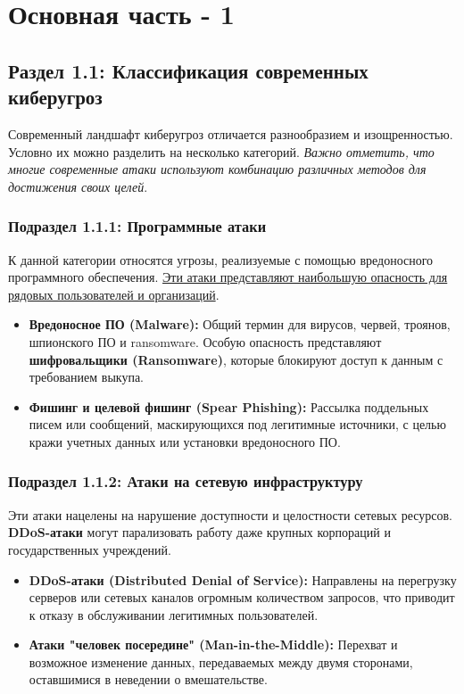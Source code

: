 \documentclass[14pt]{extreport}
\begin{document}
\chapter{Основная часть - 1}
\label{chap:main1}

\section{Раздел 1.1: Классификация современных киберугроз}
\label{sec:threats}

Современный ландшафт киберугроз отличается разнообразием и изощренностью. Условно их можно разделить на несколько категорий. \textit{Важно отметить, что многие современные атаки используют комбинацию различных методов для достижения своих целей}.

\subsection{Подраздел 1.1.1: Программные атаки}
\label{subsec:malware}

К данной категории относятся угрозы, реализуемые с помощью вредоносного программного обеспечения. \underline{Эти атаки представляют наибольшую опасность для рядовых пользователей и организаций}.

\begin{itemize}
    \item \textbf{Вредоносное ПО (Malware):} Общий термин для вирусов, червей, троянов, шпионского ПО и ransomware. Особую опасность представляют \textbf{шифровальщики (Ransomware)}, которые блокируют доступ к данным с требованием выкупа.
    \item \textbf{Фишинг и целевой фишинг (Spear Phishing):} Рассылка поддельных писем или сообщений, маскирующихся под легитимные источники, с целью кражи учетных данных или установки вредоносного ПО.
\end{itemize}

\subsection{Подраздел 1.1.2: Атаки на сетевую инфраструктуру}
\label{subsec:network}

Эти атаки нацелены на нарушение доступности и целостности сетевых ресурсов. \textbf{DDoS-атаки} могут парализовать работу даже крупных корпораций и государственных учреждений.

\begin{itemize}
    \item \textbf{DDoS-атаки (Distributed Denial of Service):} Направлены на перегрузку серверов или сетевых каналов огромным количеством запросов, что приводит к отказу в обслуживании легитимных пользователей.
    \item \textbf{Атаки "человек посередине" (Man-in-the-Middle):} Перехват и возможное изменение данных, передаваемых между двумя сторонами, оставшимися в неведении о вмешательстве.
\end{itemize}
\end{document}
